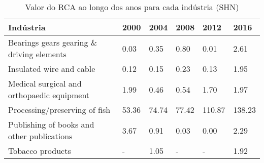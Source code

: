 \begin{table}
\centering
\caption{Valor do RCA ao longo dos anos para cada indústria (SHN)}
\label{tab:ex3-tempo-SHN}
\begin{tabular}{p{6cm}p{1.5cm}p{1.5cm}p{1.5cm}p{1.5cm}p{1.5cm}}
\toprule
                                 Indústria &  2000 &  2004 &  2008 &   2012 &   2016 \\
\midrule
 Bearings gears gearing \& driving elements &  0.03 &  0.35 &  0.80 &   0.01 &   2.61 \\
                  Insulated wire and cable &  0.12 &  0.15 &  0.23 &   0.13 &   1.95 \\
Medical surgical and orthopaedic equipment &  1.99 &  0.46 &  0.54 &   1.70 &   1.97 \\
             Processing/preserving of fish & 53.36 & 74.74 & 77.42 & 110.87 & 138.23 \\
Publishing of books and other publications &  3.67 &  0.91 &  0.03 &   0.00 &   2.29 \\
                          Tobacco products &     - &  1.05 &     - &      - &   1.92 \\
\bottomrule
\end{tabular}
\end{table}
